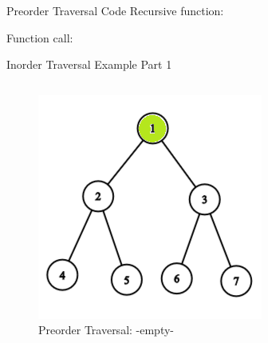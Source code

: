 \documentclass[aspectratio=169]{beamer}%
\begin{document}
\begin{frame}{Preorder Traversal Code}
    Recursive function:
    
    Function call:
    
\end{frame}

\begin{frame}{Inorder Traversal Example Part 1}
    \begin{columns}
        \begin{column}{0.32\textwidth}
            \begin{figure}
                \centering
                \includegraphics[width = .9\linewidth]{tree-in 1.png}
                \caption{Preorder Traversal: -empty-}
            \end{figure}
        \end{column}
        \hfill
        \begin{column}{0.32\textwidth}
            \begin{figure}
                \centering

\end{figure}
\end{column}
\end{columns}
\end{frame}
\end{document}
